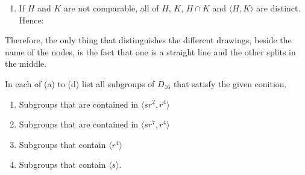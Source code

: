 \begin{solution}
\begin{enumerate}
        \item If $H$ and $K$ are not comparable, all of $H$, $K$, $H\cap K$ and $\langle H,K \rangle$ are distinct. Hence:
        
        \begin{center}
        \end{center}
    \end{enumerate}

    Therefore, the only thing that distinguishes the different drawings, beside the name of the nodes, is the fact that one is a straight line and the other splits in the middle. \\
\end{solution}

\begin{exercise}
    In each of (a) to (d) list all subgroups of $D_{16}$ that satisfy the given conition.
    \begin{enumerate}[label = \textbf{(\alph*)}]
        \item Subgroups that are contained in $\langle sr^2, r^4 \rangle$
        \item Subgroups that are contained in $\langle sr^7, r^4 \rangle$
        \item Subgroups that contain $\langle r^4 \rangle$
        \item Subgroups that contain $\langle s \rangle$.
    \end{enumerate}
\end{exercise}

